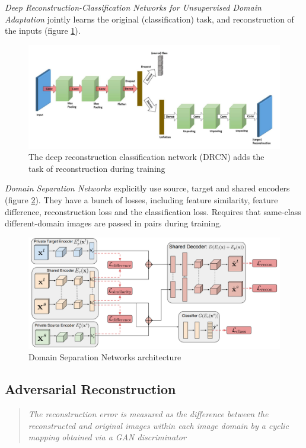 \documentclass{report}
\newcommand{\quoteit}[1]{\begin{quote}\textit{#1}\end{quote}}
\begin{document}
\textit{Deep Reconstruction-Classification Networks for Unsupervised Domain Adaptation}\parencite{drcn} jointly learns the original (classification) task, and reconstruction of the inputs (figure \ref{fig:drcn}). \\
\begin{figure}
	\centering
	\includegraphics[width=12cm]{imgs/drcn}
	\caption{The deep reconstruction classification network (DRCN) adds the task of reconstruction during training}
	\label{fig:drcn}
\end{figure}

\textit{Domain Separation Networks}\parencite{domainsep} explicitly use source, target and shared encoders (figure \ref{fig:domainsep}). They have a bunch of losses, including feature similarity, feature difference, reconstruction loss and the classification loss. Requires that same-class different-domain images are passed in pairs during training.
\begin{figure}
	\centering
	\includegraphics[width=14cm]{imgs/domainsep}
	\caption{Domain Separation Networks architecture}
	\label{fig:domainsep}
\end{figure}



\subsection{Adversarial Reconstruction}
\quoteit{The reconstruction error is measured as the difference between the reconstructed and original images within each image domain by a cyclic mapping obtained via a GAN discriminator}
\end{document}

